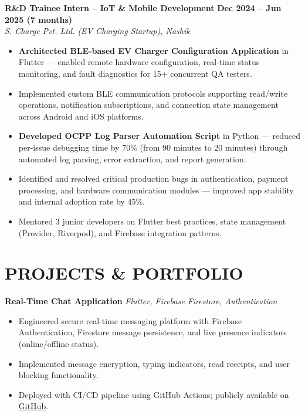 \documentclass[a4paper,11pt]{article}
\begin{document}
\noindent\textbf{R\&D Trainee Intern -- IoT \& Mobile Development} \hfill \textbf{Dec 2024 -- Jun 2025 (7 months)}\\
\textit{S. Charge Pvt. Ltd. (EV Charging Startup), Nashik}
\begin{itemize}[leftmargin=*,noitemsep,topsep=2pt,itemsep=3pt]
    \item \textbf{Architected BLE-based EV Charger Configuration Application} in Flutter — enabled remote hardware configuration, real-time status monitoring, and fault diagnostics for 15+ concurrent QA testers.
    \item Implemented custom BLE communication protocols supporting read/write operations, notification subscriptions, and connection state management across Android and iOS platforms.
    \item \textbf{Developed OCPP Log Parser Automation Script} in Python — reduced per-issue debugging time by 70\% (from 90 minutes to 20 minutes) through automated log parsing, error extraction, and report generation.
    \item Identified and resolved critical production bugs in authentication, payment processing, and hardware communication modules — improved app stability and internal adoption rate by 45\%.
    \item Mentored 3 junior developers on Flutter best practices, state management (Provider, Riverpod), and Firebase integration patterns.
\end{itemize}
\vspace{-2mm}

\section{PROJECTS \& PORTFOLIO}

\noindent\textbf{Real-Time Chat Application} \hfill \textit{Flutter, Firebase Firestore, Authentication}
\begin{itemize}[leftmargin=*,noitemsep,topsep=2pt,itemsep=2pt]
    \item Engineered secure real-time messaging platform with Firebase Authentication, Firestore message persistence, and live presence indicators (online/offline status).
    \item Implemented message encryption, typing indicators, read receipts, and user blocking functionality.
    \item Deployed with CI/CD pipeline using GitHub Actions; publicly available on \href{https://github.com/petkarrushikesh}{GitHub}.
\end{itemize}
\vspace{1.5mm}
\end{document}
